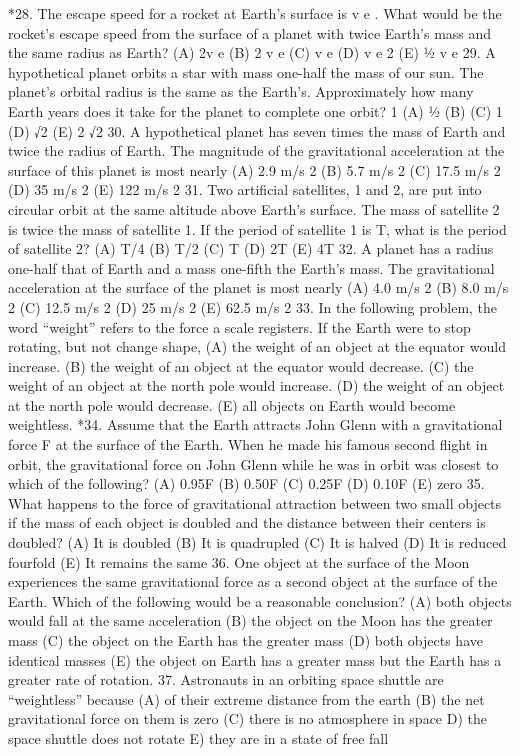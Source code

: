 *28. The escape speed for a rocket at Earth's surface is v e . What would be the rocket's escape speed from the surface
of a planet with twice Earth's mass and the same radius as Earth?
(A) 2v e
(B)
2 v e
(C) v e
(D)
v e
2
(E) 1⁄2 v e
29. A hypothetical planet orbits a star with mass one-half the mass of our sun. The planet’s orbital radius is the
same as the Earth’s. Approximately how many Earth years does it take for the planet to complete one orbit?
1
(A) 1⁄2 (B)
(C) 1 (D) √2 (E) 2
√2
30. A hypothetical planet has seven times the mass of Earth and twice the radius of Earth. The magnitude of the
gravitational acceleration at the surface of this planet is most nearly
(A) 2.9 m/s 2 (B) 5.7 m/s 2 (C) 17.5 m/s 2 (D) 35 m/s 2 (E) 122 m/s 2
31. Two artificial satellites, 1 and 2, are put into circular orbit at the same altitude above Earth’s surface. The mass
of satellite 2 is twice the mass of satellite 1. If the period of satellite 1 is T, what is the period of satellite 2?
(A) T/4 (B) T/2 (C) T (D) 2T (E) 4T
32. A planet has a radius one-half that of Earth and a mass one-fifth the Earth’s mass. The gravitational acceleration
at the surface of the planet is most nearly
(A) 4.0 m/s 2 (B) 8.0 m/s 2 (C) 12.5 m/s 2 (D) 25 m/s 2 (E) 62.5 m/s 2
33. In the following problem, the word “weight” refers to the force a scale registers. If the Earth were to stop
rotating, but not change shape,
(A) the weight of an object at the equator would increase.
(B) the weight of an object at the equator would decrease.
(C) the weight of an object at the north pole would increase.
(D) the weight of an object at the north pole would decrease.
(E) all objects on Earth would become weightless.
*34. Assume that the Earth attracts John Glenn with a gravitational force F at the surface of the Earth. When he
made his famous second flight in orbit, the gravitational force on John Glenn while he was in orbit was closest
to which of the following?
(A) 0.95F (B) 0.50F (C) 0.25F (D) 0.10F (E) zero
35. What happens to the force of gravitational attraction between two small objects if the mass of each object is
doubled and the distance between their centers is doubled?
(A) It is doubled (B) It is quadrupled (C) It is halved (D) It is reduced fourfold (E) It remains the same
36. One object at the surface of the Moon experiences the same gravitational force as a second object at the surface
of the Earth. Which of the following would be a reasonable conclusion?
(A) both objects would fall at the same acceleration
(B) the object on the Moon has the greater mass
(C) the object on the Earth has the greater mass
(D) both objects have identical masses
(E) the object on Earth has a greater mass but the Earth has a greater rate of rotation.
37. Astronauts in an orbiting space shuttle are “weightless” because
(A) of their extreme distance from the earth
(B) the net gravitational force on them is zero
(C) there is no atmosphere in space
D) the space shuttle does not rotate
E) they are in a state of free fall




